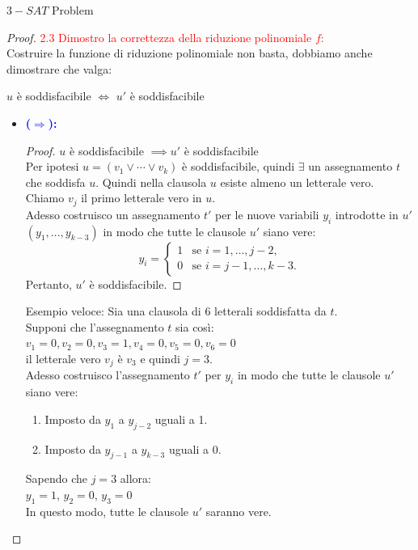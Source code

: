 \documentclass{article}  %
\theoremstyle{definition}
\begin{document}
\begin{theorem}{$3-SAT$ Problem}
\begin{proof}
		\textcolor{red}{{2.3 Dimostro la correttezza della riduzione polinomiale $f$:}} \\
		Costruire la funzione di riduzione polinomiale non basta, dobbiamo anche dimostrare che valga:
		\begin{center}
			$u$ è soddisfacibile $\iff$ $u'$ è soddisfacibile
		\end{center}
		\begin{itemize}
			\item \textcolor{blue}{\textbf{($\Longrightarrow$):}}
			      \begin{proof}
				      $u$ è soddisfacibile $\implies u'$ è soddisfacibile \\
				      Per ipotesi $u=(v_1 \lor \cdots \lor v_k)$ è soddisfacibile, quindi $\exists$ un assegnamento $t$ che soddisfa $u$.
				      Quindi nella clausola $u$ esiste almeno un letterale vero. Chiamo $v_j$ il primo letterale vero in $u$. \\
				      Adesso costruisco un assegnamento $t'$ per le nuove variabili $y_i$ introdotte in $u'$ $(y_1,...,y_{k-3})$ in modo che tutte le clausole $u'$ siano vere:
				      \[
					      y_i =
					      \begin{cases}
						      1 & \text{se } i=1,\dots,j-2,   \\
						      0 & \text{se } i=j-1,\dots,k-3.
					      \end{cases}
				      \]
				      Pertanto, $u'$ è soddisfacibile.
			      \end{proof}
			      \begin{itshape}
				      Esempio veloce: Sia una clausola di 6 letterali soddisfatta da $t$. \\
				      Supponi che l'assegnamento $t$ sia così: \\
				      $v_1=0, v_2=0, v_3=1, v_4=0, v_5=0, v_6=0$ \\
				      il letterale vero $v_j$ è $v_3$ e quindi $j=3$. \\
				      Adesso costruisco l'assegnamento $t'$ per $y_i$ in modo che tutte le clausole $u'$ siano vere:
				      \begin{enumerate}
					      \item Imposto da $y_1$ a $y_{j-2}$ uguali a 1.
					      \item Imposto da $y_{j-1}$ a $y_{k-3}$ uguali a 0.
				      \end{enumerate}
				      Sapendo che $j=3$ allora: \\
				      $y_1=1$, $y_2=0$, $y_3=0$ \\
				      In questo modo, tutte le clausole $u'$ saranno vere.
			      \end{itshape}


\end{itemize}
\end{proof}
\end{theorem}
\end{document}
